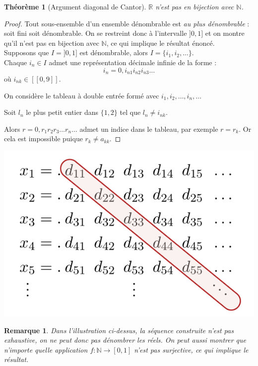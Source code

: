 \documentclass[french]{article}
\theoremstyle{definition}
\theoremstyle{plain}
\newtheorem{theorem}[subsubsection]{Théorème}
\theoremstyle{plain}
\theoremstyle{plain}
\theoremstyle{plain}
\newtheorem{remark}[subsubsection]{Remarque}
\theoremstyle{plain}
\begin{document}
\begin{theorem}[Argument diagonal de Cantor]
	\( \mathbb{R} \) n'est pas en bijection avec \( \mathbb{N} \). \cite{aigner2018proofs} \cite{dehornoy2017théorie}
\end{theorem}
\begin{proof}
	Tout sous-ensemble d'un ensemble dénombrable est \textit{au plus dénombrable} : soit fini soit dénombrable. On se restreint donc à l'intervalle \( ]0,1] \) et on montre qu'il n'est pas en bijection avec \( \mathbb{N} \), ce qui implique le résultat énoncé. \\
	Supposons que \( I = ]0,1] \) est dénombrable, alors \( I = \{i_{1}, i_{2}, \ldots \} \). \\ 
	Chaque \( i_{n} \in I \) admet une représentation décimale infinie de la forme :
	\begin{equation*}
		i_{n} = 0,i_{n1}i_{n2}i_{n3}\ldots 
	\end{equation*}
	où \( i_{nk} \in [\![0,9]\!] \).

	On considère le tableau à double entrée formé avec \( i_{1}, i_{2}, \ldots, i_{n}, \ldots \) 

	Soit \( l_{n} \) le plus petit entier dans \( \{1,2\}\) tel que \( l_{n} \neq i_{nk}\). 

	Alors \( r = 0,r_{1}r_{2}r_{3} \ldots r_{n}\ldots \) admet un indice dans le tableau, par exemple \( r = r_{k} \). Or cela est impossible puique \( r_{k} \neq a_{kk} \).
	
\end{proof}

\begin{center}
	\includegraphics[scale=0.3]{rVEQX.png}
\end{center}
\begin{remark}
	Dans l’illustration ci-dessus, la séquence construite n’est pas exhaustive, on ne peut donc pas dénombrer les réels. On peut aussi montrer que n'importe quelle application \( f : \mathbb{N} \rightarrow [0,1] \) n'est pas surjective, ce qui implique le résultat.
\end{remark}
\end{document}
